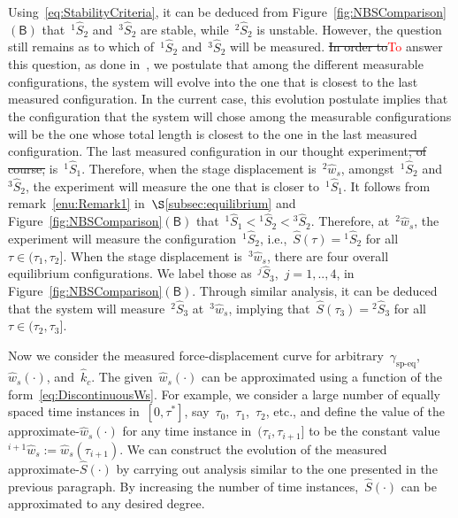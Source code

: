 \documentclass[preprint,10pt,times]{elsarticle}
\numberwithin{equation}{section}
\newcommand{\lsc}[2][\mathscr{l}]{{}^{ #1 }\! #2}
\newcommand{\pr}[1]{\left( #1 \right)}
\newcommand{\subf}[1]{\pr{\textsf{#1}}}
\begin{document}
Using~\eqref{eq:StabilityCriteria}, it can be deduced from Figure~\ref{fig:NBSComparison}$\subf{B}$
that~$\lsc[1]{\hat{S}}_2$ and~$\lsc[3]{\hat{S}}_2$ are stable,
while~$\lsc[2]{\hat{S}}_2$ is unstable. However, the question still
remains as to which of~$\lsc[1]{\hat{S}}_2$ and~$\lsc[3]{\hat{S}}_2$
will be measured. \sout{In order to}\textcolor{red}{To} answer this question, as done in~\cite{kesari2011effective},
we postulate that among the different measurable configurations, the
system will evolve into the one that is closest to the last measured
configuration. In the current case, this evolution postulate implies
that the configuration that the system will chose among the measurable
configurations will be the one whose total length is closest to the
one in the last measured configuration. The last measured configuration
in our thought experiment\sout{, of course,} is~$\lsc[1]{\hat{S}}_1$. Therefore,
when the stage displacement is~$\lsc[2]{\hat{w}}_s$, amongst~$\lsc[1]{\hat{S}}_2$
and~$\lsc[3]{\hat{S}}_2$, the experiment will measure the one that
is closer to~$\lsc[1]{\hat{S}}_1$. It follows from remark{~\ref{enu:Remark1}} in~$\S$\ref{subsec:equilibrium}
and Figure~\ref{fig:NBSComparison}$\subf{B}$ that~$\lsc[1]{\hat{S}}_1<\lsc[1]{\hat{S}}_2<\lsc[3]{\hat{S}}_2$.
Therefore, at~$\lsc[2]{\hat{w}}_s$, the experiment will measure
the configuration~$\lsc[1]{\hat{S}}_2$, i.e.,~$\hat{S}\pr{\tau}=\lsc[1]{\hat{S}}_2$
for all~$\tau\in (\tau_1,\tau_2]$. When the stage displacement is~$\lsc[3]{\hat{w}}_s$,
there are four overall equilibrium configurations. We label those
as~$\lsc[j]{\hat{S}}_3$,~$j=1,..,4$, in Figure~\ref{fig:NBSComparison}$\subf{B}$.
Through similar analysis, it can be deduced that the system will
measure~$\lsc[2]{\hat{S}}_3$ at~$\lsc[3]{\hat{w}}_s$, implying
that~$\hat{S}\pr{\tau_3}=\lsc[2]{\hat{S}}_3$ for all~$\tau\in (\tau_2,\tau_3]$.

Now we consider the measured force-displacement curve for arbitrary~$\gamma_{\text{sp-eq}}$,~$\hat{w}_s(\cdot)$,
and~$\hat{k}_{c}$. The given~$\hat{w}_s(\cdot)$ can be approximated
using a function of the form~\eqref{eq:DiscontinuousWs}. For example,
we consider a large number of equally spaced time instances in~$[0,\tau^*]$,
say~$\tau_0$,~$\tau_1$,~$\tau_2$, etc., and define the value
of the approximate-$\hat{w}_s(\cdot)$ for any time instance in~$(\tau_i,\tau_{i+1}]$
to be the constant value~$\lsc[i+1]{\hat{w}}_s:=\hat{w}_s(\tau_{i+1})$.
We can construct the evolution of the measured approximate-$\hat{S}\pr{\cdot}$
by carrying out analysis similar to the one presented in the previous
paragraph. By increasing the number of time instances,~$\hat{S}(\cdot)$
can be approximated to any desired degree.
\end{document}
